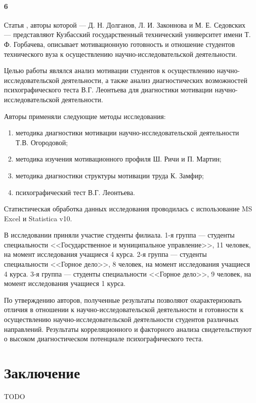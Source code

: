 \documentclass[oneside]{scrartcl}
\begin{document}
\paragraph{6}
Статья \cite{dolganov}, авторы которой --- Д. Н. Долганов, Л. И. Законнова и М. Е. Седовских --- представляют Кузбасский
государственный технический университет имени Т. Ф. Горбачева, описывает мотивационную готовность и отношение студентов
технического вуза к осуществлению научно-исследовательской деятельности.

Целью работы являлся анализ мотивации студентов к осуществлению научно-исследовательской деятельности, а также анализ
диагностических возможностей психографического теста В.Г. Леонтьева для диагностики мотивации научно-исследовательской
деятельности.

Авторы применяли следующие методы исследования:
\begin{enumerate}[1)]
\item методика диагностики мотивации научно-исследовательской деятельности Т.В. Огородовой; 
\item методика изучения мотивационного профиля Ш. Ричи и П. Мартин;
\item методика диагностики структуры мотивации труда К. Замфир;
\item психографический тест В.Г. Леонтьева.
\end{enumerate}
Статистическая обработка данных исследования проводилась с использование MS Excel и Statistica v10.

В исследовании приняли участие студенты филиала. 1-я группа --- студенты специальности <<Государственное и муниципальное
управление>>, 11 человек, на момент исследования учащиеся 4 курса. 2-я группа --- студенты специальности <<Горное дело>>, 
8 человек, на момент исследования учащиеся 4 курса. 3-я группа --- студенты специальности <<Горное дело>>, 9 человек, 
на момент исследования учащиеся 1 курса.

По утверждению авторов, полученные результаты позволяют охарактеризовать отличия в отношении к научно-исследовательской
деятельности и готовности к осуществлению научно-исследовательской деятельности студентов различных направлений. Результаты
корреляционного и факторного анализа свидетельствуют о высоком диагностическом потенциале психографического теста.

\section*{Заключение}

TODO


\printbibliography
\end{document}

